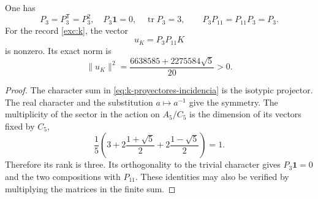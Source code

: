 \begin{lemma}
\label{lem:k-sector-no-nulo}
One has
\[
 P_3=P_3^{\mathsf T}=P_3^2,\quad
 P_3\mathbf1=0,\quad \operatorname{tr}P_3=3,
 \qquad P_3P_{11}=P_{11}P_3=P_3.
\]
For the record \eqref{exc:k}, the vector
\begin{equation}
 u_K=P_3P_{11}K
 \label{eq:k-vector-direccional}
\end{equation}
is nonzero. Its exact norm is
\begin{equation}
 \lVert u_K\rVert^2
 =\frac{6638585+2275584\sqrt5}{20}>0.
 \label{eq:k-norma-direccion}
\end{equation}
\end{lemma}
\begin{proof}
The character sum in \eqref{eq:k-proyectores-incidencia} is the isotypic
projector. The real character and the substitution \(a\mapsto a^{-1}\) give
the symmetry. The multiplicity of the sector in the action on \(A_5/C_5\)
is the dimension of its vectors fixed by \(C_5\),
\[
 \frac15\left(3+2\frac{1+\sqrt5}{2}
                 +2\frac{1-\sqrt5}{2}\right)=1.
\]
Therefore its rank is three. Its orthogonality to the trivial character gives
\(P_3\mathbf1=0\) and the two compositions with \(P_{11}\). These
identities may also be verified by multiplying the matrices in the finite
sum.


\end{proof}

